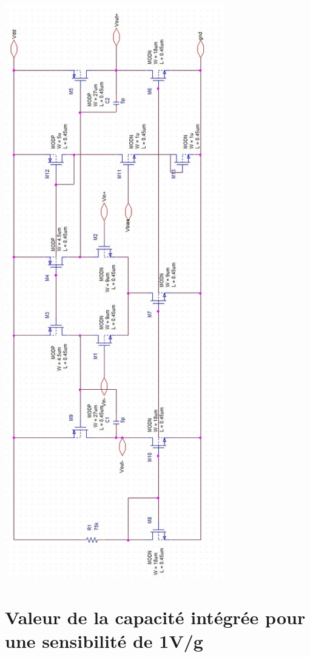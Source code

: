 \documentclass{article}
\begin{document}
\begin{centering}
    \includegraphics[height=25cm]{schema_diff.png}
\end{centering}

\section{Valeur de la capacité intégrée pour une sensibilité de 1V/g}
\end{document}
